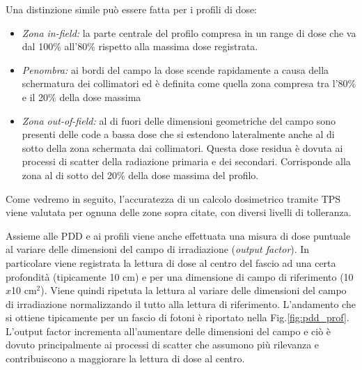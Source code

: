 Una distinzione simile può essere fatta per i profili di dose:
\begin{itemize}
\item \textit{Zona in-field:} la parte centrale del profilo compresa in un range di dose che va dal 100\% all'80\% rispetto alla massima dose registrata.
\item \textit{Penombra:} ai bordi del campo la dose scende rapidamente a causa della schermatura dei collimatori ed è definita come quella zona compresa tra l'80\% e il 20\% della dose massima
\item \textit{Zona out-of-field:} al di fuori delle dimensioni geometriche del campo sono presenti delle code a bassa dose che si estendono lateralmente anche al di sotto della zona schermata dai collimatori. Questa dose residua è dovuta ai processi di scatter della radiazione primaria e dei secondari. Corrisponde alla zona al di sotto del 20\% della dose massima del profilo.
\end{itemize}

Come vedremo in seguito, l'accuratezza di un calcolo dosimetrico tramite TPS viene valutata per ognuna delle zone sopra citate, con diversi livelli di tolleranza. 

Assieme alle PDD e ai profili viene anche effettuata una misura di dose puntuale al variare delle dimensioni del campo di irradiazione (\textit{output factor}). In particolare viene registrata la lettura di dose al centro del fascio ad una certa profondità (tipicamente 10 cm) e per una dimensione di campo di riferimento (10$x$10 cm$^2$). Viene quindi ripetuta la lettura al variare delle dimensioni del campo di irradiazione normalizzando il tutto alla lettura di riferimento. L'andamento che si ottiene tipicamente per un fascio di fotoni è riportato nella Fig.\ref{fig:pdd_prof}. L'output factor incrementa all'aumentare delle dimensioni del campo e ciò è dovuto principalmente ai processi di scatter che assumono più rilevanza e contribuiscono a maggiorare la lettura di dose al centro.

